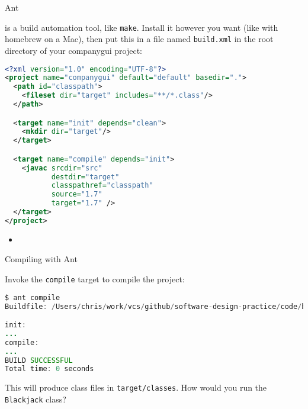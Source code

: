 \documentclass{beamer}
\begin{document}
\begin{frame}[fragile]{Ant}

\vspace{-.07in}
 is a build automation tool, like {\tt make}.  Install it however you want (like with homebrew on a Mac), then put this in a file named {\tt build.xml} in the root directory of your companygui project:
\vspace{-.07in}
\begin{lstlisting}[language=xml]
<?xml version="1.0" encoding="UTF-8"?>
<project name="companygui" default="default" basedir=".">
  <path id="classpath">
    <fileset dir="target" includes="**/*.class"/>
  </path>

  <target name="init" depends="clean">
    <mkdir dir="target"/>
  </target>

  <target name="compile" depends="init">
    <javac srcdir="src"
           destdir="target"
           classpathref="classpath"
           source="1.7"
           target="1.7" />
  </target>
</project>
\end{lstlisting}

\begin{itemize}
\item
\end{itemize}


\end{frame}

\begin{frame}[fragile]{Compiling with Ant}


Invoke the {\tt compile} target to compile the project:
\begin{lstlisting}[language=Java]
$ ant compile
Buildfile: /Users/chris/work/vcs/github/software-design-practice/code/blackjack/build.xml

init:
...
compile:
...
BUILD SUCCESSFUL
Total time: 0 seconds
\end{lstlisting}

This will produce class files in {\tt target/classes}.  How would you run the {\tt Blackjack} class?

\end{frame}
\end{document}
